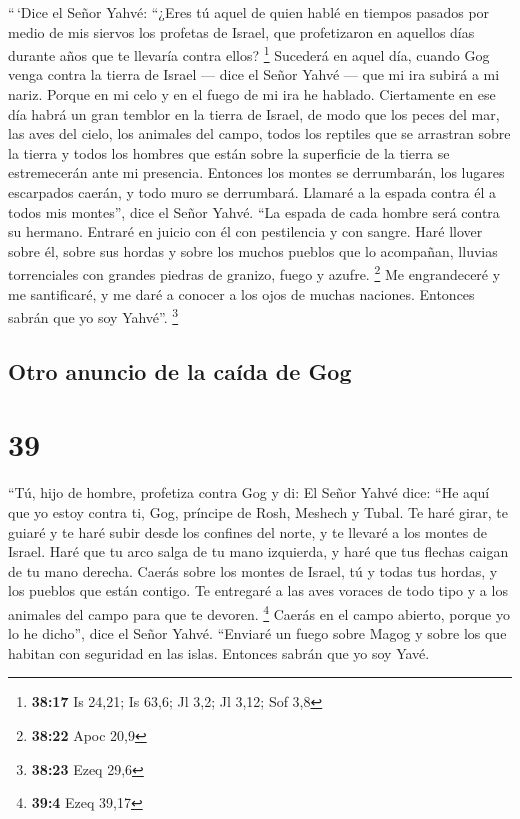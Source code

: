 ``\,`Dice el Señor Yahvé: ``¿Eres tú aquel de quien
hablé en tiempos pasados por medio de mis siervos los profetas de
Israel, que profetizaron en aquellos días durante años que te llevaría
contra ellos? \footnote{\textbf{38:17} Is 24,21; Is 63,6; Jl 3,2; Jl
  3,12; Sof 3,8}  Sucederá en aquel día, cuando Gog venga
contra la tierra de Israel --- dice el Señor Yahvé --- que mi ira subirá
a mi nariz.  Porque en mi celo y en el fuego de mi ira he
hablado. Ciertamente en ese día habrá un gran temblor en la tierra de
Israel,  de modo que los peces del mar, las aves del
cielo, los animales del campo, todos los reptiles que se arrastran sobre
la tierra y todos los hombres que están sobre la superficie de la tierra
se estremecerán ante mi presencia. Entonces los montes se derrumbarán,
los lugares escarpados caerán, y todo muro se derrumbará.
 Llamaré a la espada contra él a todos mis montes'', dice
el Señor Yahvé. ``La espada de cada hombre será contra su hermano.
 Entraré en juicio con él con pestilencia y con sangre.
Haré llover sobre él, sobre sus hordas y sobre los muchos pueblos que lo
acompañan, lluvias torrenciales con grandes piedras de granizo, fuego y
azufre. \footnote{\textbf{38:22} Apoc 20,9}  Me
engrandeceré y me santificaré, y me daré a conocer a los ojos de muchas
naciones. Entonces sabrán que yo soy Yahvé''. \footnote{\textbf{38:23}
  Ezeq 29,6}

\hypertarget{otro-anuncio-de-la-cauxedda-de-gog}{%
\subsection{Otro anuncio de la caída de
Gog}\label{otro-anuncio-de-la-cauxedda-de-gog}}

\hypertarget{section-38}{%
\section{39}\label{section-38}}

 ``Tú, hijo de hombre, profetiza contra Gog y di: El Señor
Yahvé dice: ``He aquí que yo estoy contra ti, Gog, príncipe de Rosh,
Meshech y Tubal.  Te haré girar, te guiaré y te haré subir
desde los confines del norte, y te llevaré a los montes de Israel.
 Haré que tu arco salga de tu mano izquierda, y haré que
tus flechas caigan de tu mano derecha.  Caerás sobre los
montes de Israel, tú y todas tus hordas, y los pueblos que están
contigo. Te entregaré a las aves voraces de todo tipo y a los animales
del campo para que te devoren. \footnote{\textbf{39:4} Ezeq 39,17}
 Caerás en el campo abierto, porque yo lo he dicho'', dice
el Señor Yahvé.  ``Enviaré un fuego sobre Magog y sobre
los que habitan con seguridad en las islas. Entonces sabrán que yo soy
Yavé.

